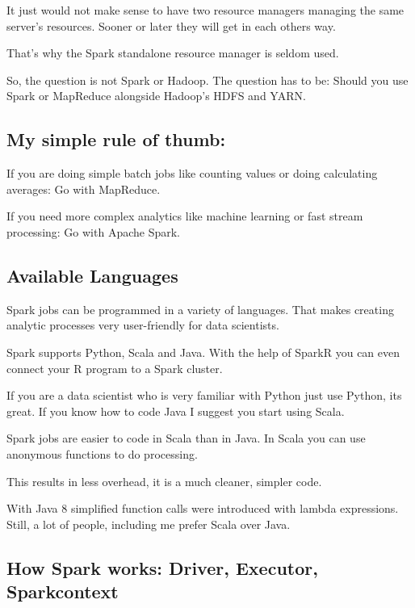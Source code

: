 \documentclass[12pt, numbers=noenddot]{scrreprt} %
\begin{document}
It just would not make sense to have two resource managers managing the same server’s resources. Sooner or later they will get in each others way.

That’s why the Spark standalone resource manager is seldom used.

So, the question is not Spark or Hadoop. The question has to be: Should you use Spark or MapReduce alongside Hadoop’s HDFS and YARN.

\subsection{My simple rule of thumb:}

If you are doing simple batch jobs like counting values or doing calculating averages: Go with MapReduce.

If you need more complex analytics like machine learning or fast stream processing: Go with Apache Spark.

\subsection{Available Languages}

Spark jobs can be programmed in a variety of languages. That makes creating analytic processes very user-friendly for data scientists.

Spark supports Python, Scala and Java. With the help of SparkR you can even connect your R program to a Spark cluster.

If you are a data scientist who is very familiar with Python just use Python, its great. If you know how to code Java I suggest you start using Scala.

Spark jobs are easier to code in Scala than in Java. In Scala you can use anonymous functions to do processing.

This results in less overhead, it is a much cleaner, simpler code.

With Java 8 simplified function calls were introduced with lambda expressions. Still, a lot of people, including me prefer Scala over Java.

\subsection{How Spark works: Driver, Executor, Sparkcontext }
\end{document}
